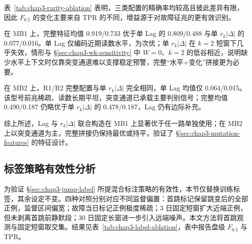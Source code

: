 表~\ref{tab:chap3-rarity-ablation} 表明，三类配置的精确率均较高且彼此差异有限，因此 $F_{0.5}$ 的变化主要来自 TPR 的不同，增益源于对故障征兆的更有效识别。

在 MB1 上，完整特征均值 0.919/0.733 优于单 Lag 的 0.809/0.488 与单 $r_k|\Delta|$ 的 0.077/0.016。单 Lag 仅编码近期读数水平，为次优；单 $r_k|\Delta|$ 在 $k{=}2$ 短窗下几乎失效，情形与 \S\ref{sec:chap3-wk-sensitivity} 中 $W{=}0$、$k{=}2$ 的低谷相近，说明缺少水平上下文时仅靠突变通道难以支撑稳定预警，完整“水平+变化”拼接更为必要。

在 MB2 上，R1/R2 完整配置与单 $r_k|\Delta|$ 完全相同，单 Lag 均值仅 0.064/0.015。该型号前兆稀疏、读数长期平坦，突变通道已承载主要判别信号；完整均值 0.490/0.187 仍略优于单 $r_k|\Delta|$ 的 0.478/0.187，Lag 仍有边际补充。

综上所述，Lag 与 $r_k|\Delta|$ 联合构造在 MB1 上显著优于任一路单独使用；在 MB2 上以突变通道为主，完整拼接仍保持最优或持平，验证了 \S\ref{sec:chap3-mutation-features} 的特征设计。


\subsection{标签策略有效性分析}
\label{sec:chap3-label-ablation}

为验证 \S\ref{sec:chap3-jump-label} 所提混合标注策略的有效性，本节仅替换训练标签，其余设定不变。四种对照分别对应不同监督偏置：首跳标记保留跳变后的全部正例，监督区间偏宽；故障当日标记正例极度稀疏；3 日固定短窗扩大近端正例，但未剥离首跳前静默段；30 日固定长窗进一步引入远端噪声。本文方法将首跳观测与固定短窗取交集。结果见表~\ref{tab:chap3-label-ablation}，表中报告盘级 $F_{0.5}$ 与 TPR。

